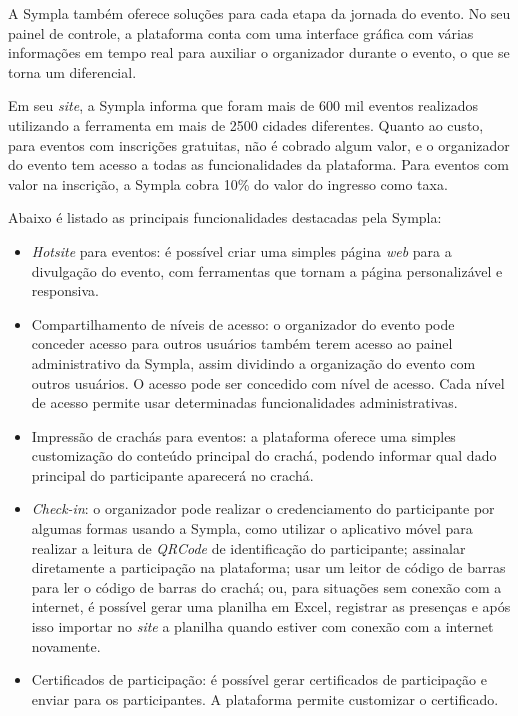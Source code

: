 A Sympla também oferece soluções para cada etapa da jornada do evento. No seu painel de controle, a plataforma conta com uma interface gráfica com várias informações em tempo real para auxiliar o organizador durante o evento, o que se torna um diferencial.

Em seu \textit{site}, a Sympla informa que foram mais de 600 mil eventos realizados utilizando a ferramenta em mais de 2500 cidades diferentes. Quanto ao custo, para eventos com inscrições gratuitas, não é cobrado algum valor, e o organizador do evento tem acesso a todas as funcionalidades da plataforma. Para eventos com valor na inscrição, a Sympla cobra 10\% do valor do ingresso como taxa.

Abaixo é listado as principais funcionalidades destacadas pela Sympla:

\begin{itemize}
    \item \textit{Hotsite} para eventos: é possível criar uma simples página \textit{web} para a divulgação do evento, com ferramentas que tornam a página personalizável e responsiva.
    \item Compartilhamento de níveis de acesso: o organizador do evento pode conceder acesso para outros usuários também terem acesso ao painel administrativo da Sympla, assim dividindo a organização do evento com outros usuários. O acesso pode ser concedido com nível de acesso. Cada nível de acesso permite usar determinadas funcionalidades administrativas.
    \item Impressão de crachás para eventos: a plataforma oferece uma simples customização do conteúdo principal do crachá, podendo informar qual dado principal do participante aparecerá no crachá.
    \item \textit{Check-in}: o organizador pode realizar o credenciamento do participante por algumas formas usando a Sympla, como utilizar o aplicativo móvel para realizar a leitura de \textit{QRCode} de identificação do participante; assinalar diretamente a participação na plataforma; usar um leitor de código de barras para ler o código de barras do crachá; ou, para situações sem conexão com a internet, é possível gerar uma planilha em Excel, registrar as presenças e após isso importar no \textit{site} a planilha quando estiver com conexão com a internet novamente.
    \item Certificados de participação: é possível gerar certificados de participação e enviar para os participantes. A plataforma permite customizar o certificado.
\end{itemize}

